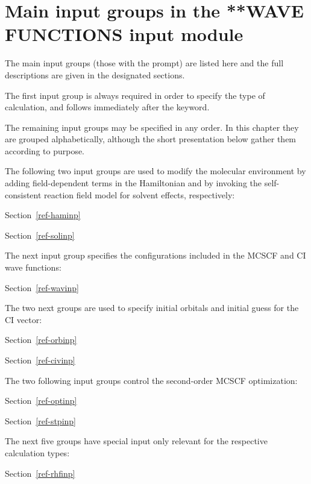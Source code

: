 \pagebreak[3]
\section{\label{sec:ref-newinp}
   Main input groups in the **WAVE FUNCTIONS input module}

\noindent
The main input groups (those with the {\starkey} prompt) are listed here and
the full descriptions are given in the designated sections.

\noindent
The first input group is always required in order to specify the type of
calculation, and follows immediately after the 
keyword.


\noindent The remaining input groups may be specified in any
order. In this chapter they are grouped alphabetically, although
the short presentation below gather them according to purpose.

The following two input groups are used to modify the
molecular environment by adding field-dependent
terms in the Hamiltonian and by invoking
the self-consistent reaction field model for solvent
effects, respectively:

Section~\ref{ref-haminp} 

Section~\ref{ref-solinp} 
%

\noindent
The next input group specifies the configurations included
in the MCSCF and CI wave functions:

Section~\ref{ref-wavinp} 

\noindent
The two next groups are used to specify initial orbitals and initial
guess for the CI vector:

Section~\ref{ref-orbinp} 

Section~\ref{ref-civinp} 

\noindent
The two following input groups control the second-order MCSCF
optimization:

Section~\ref{ref-optinp} 

Section~\ref{ref-stpinp} 

\noindent
The next five groups have special input only relevant for the
respective calculation types:

Section~\ref{ref-rhfinp} 


